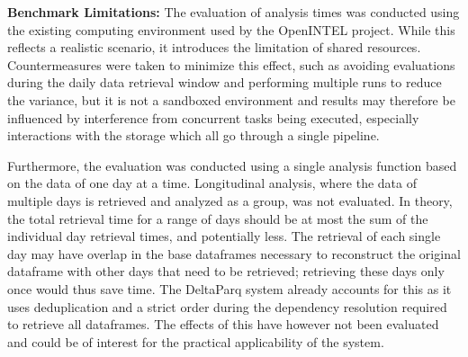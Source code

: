 \textbf{Benchmark Limitations:} The evaluation of analysis times was conducted using the existing computing environment used by the OpenINTEL project. While this reflects a realistic scenario, 
it introduces the limitation of shared resources. Countermeasures were taken to minimize this effect, such as avoiding evaluations during the daily data retrieval 
window and performing multiple runs to reduce the variance, but it is not a sandboxed environment and results may therefore be influenced by interference from 
concurrent tasks being executed, especially interactions with the storage which all go through a single pipeline. 

Furthermore, the evaluation was conducted using a single analysis function based on the data of one day at a time. Longitudinal analysis, where the data of 
multiple days is retrieved and analyzed as a group, was not evaluated. In theory, the total retrieval time for a range of days should be at most 
the sum of the individual day retrieval times, and potentially less. The retrieval of each single day may have overlap in the base dataframes necessary to 
reconstruct the original dataframe with other days that need to be retrieved; retrieving these days only once would thus save time. 
The DeltaParq system already accounts for this as it uses deduplication and a strict order during the dependency resolution required to retrieve all dataframes.
The effects of this have however not been evaluated and could be of interest for the practical applicability of the system.
